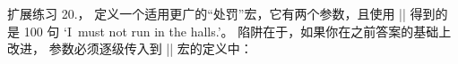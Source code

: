 {%
\dangerexercise 扩展练习 20.\punishexno ，
定义一个适用更广的``处罚''宏，它有两个参数，且使用
|| 得到的是 100 句 `I~must not run in the halls.'。
\answer 陷阱在于，如果你在之前答案的基础上改进，
参数必须逐级传入到 |\mustnt| 宏的定义中：
\begintt
\def\mustnt#1#2{I must not #1 in #2.\par}
}
